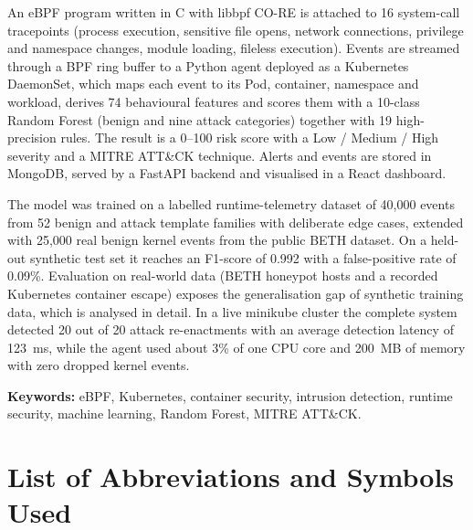 An eBPF program written in C with libbpf CO-RE is attached to 16 system-call
tracepoints (process execution, sensitive file opens, network connections,
privilege and namespace changes, module loading, fileless execution). Events are
streamed through a BPF ring buffer to a Python agent deployed as a Kubernetes
DaemonSet, which maps each event to its Pod, container, namespace and workload,
derives 74 behavioural features and scores them with a 10-class Random Forest
(benign and nine attack categories) together with 19 high-precision rules. The result
is a 0--100 risk score with a Low / Medium / High severity and a MITRE ATT\&CK
technique. Alerts and events are stored in MongoDB, served by a FastAPI backend and
visualised in a React dashboard.

The model was trained on a labelled runtime-telemetry dataset of 40,000 events from 52
benign and attack template families with deliberate edge cases, extended with 25,000
real benign kernel events from the public BETH dataset. On a held-out synthetic test
set it reaches an F1-score of 0.992 with a false-positive rate of 0.09\%. Evaluation
on real-world data (BETH honeypot hosts and a recorded Kubernetes container escape)
exposes the generalisation gap of synthetic training data, which is analysed in
detail. In a live minikube cluster the complete system detected 20 out of 20 attack
re-enactments with an average detection latency of 123~ms, while the agent used about
3\% of one CPU core and 200~MB of memory with zero dropped kernel events.

\textbf{Keywords:} eBPF, Kubernetes, container security, intrusion detection, runtime
security, machine learning, Random Forest, MITRE ATT\&CK.
\clearpage

\renewcommand{\contentsname}{Table of Contents}
\tableofcontents
\clearpage

{}
\listoffigures
\clearpage

{}
\listoftables
\clearpage

\chapter*{List of Abbreviations and Symbols Used}

